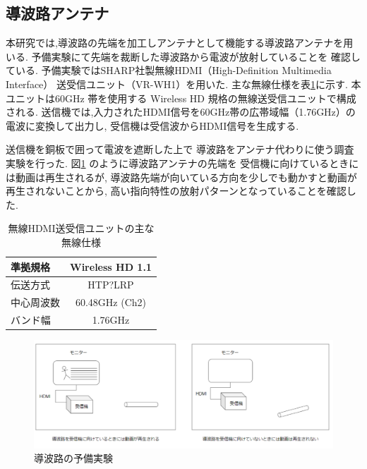 \documentclass[technicalreport]{ieicej}
\begin{document}
\subsection{導波路アンテナ}

本研究では,導波路の先端を加工しアンテナとして機能する導波路アンテナを用いる.
予備実験にて先端を裁断した導波路から電波が放射していることを
確認している.
予備実験ではSHARP社製無線HDMI（High-Definition Multimedia Interface）
送受信ユニット（VR-WH1）を用いた.
主な無線仕様を表\ref{table:wireless}に示す.
本ユニットは60GHz 帯を使用する Wireless HD 規格の無線送受信ユニットで構成される.
送信機では,入力されたHDMI信号を60GHz帯の広帯域幅（1.76GHz）の電波に変換して出力し,
受信機は受信波からHDMI信号を生成する.

送信機を銅板で囲って電波を遮断した上で
導波路をアンテナ代わりに使う調査実験を行った.
図\ref{fig:qualitative_experiment}
のように導波路アンテナの先端を
受信機に向けているときには動画は再生されるが,
導波路先端が向いている方向を少しでも動かすと動画が再生されないことから,
高い指向特性の放射パターンとなっていることを確認した.

\begin{table}[tb]
  \centering
  \label{table:wireless}
  \caption{無線HDMI送受信ユニットの主な無線仕様}
  \begin{tabular}{lc}
    \hline
    準拠規格 & Wireless HD 1.1 \\
    \hline\hline
    伝送方式 & HTP?LRP \\
    \hline
    中心周波数 & 60.48GHz (Ch2) \\
    \hline
    バンド幅 & 1.76GHz \\
    \hline
  \end{tabular}
 \end{table}

\begin{figure}[t]
  \begin{center}
    \includegraphics[bb=0.000000 0.000000 825.115172 299.291776, width=1.0\linewidth]{img/preexperiment.pdf}
    \caption{導波路の予備実験}
    \label{fig:qualitative_experiment}
  \end{center}
\end{figure}
\end{document}
